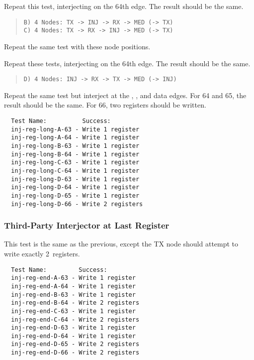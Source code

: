 Repeat this test, interjecting on the 64th edge. The result should be the
same.

\begin{quote}
  \texttt{B) 4 Nodes: TX -> INJ -> RX -> MED (-> TX)}\\
  \texttt{C) 4 Nodes: TX -> RX -> INJ -> MED (-> TX)}
\end{quote}

Repeat the same test with these node positions.

Repeat these tests, interjecting on the 64th edge. The result should be the
same.

\begin{quote}
  \texttt{D) 4 Nodes: INJ -> RX -> TX -> MED (-> INJ)}
\end{quote}

Repeat the same test but interject at the , , and 
data edges. For 64 and 65, the result should be the same. For 66, two
registers should be written.

\begin{verbatim}
  Test Name:          Success:
  inj-reg-long-A-63 - Write 1 register
  inj-reg-long-A-64 - Write 1 register
  inj-reg-long-B-63 - Write 1 register
  inj-reg-long-B-64 - Write 1 register
  inj-reg-long-C-63 - Write 1 register
  inj-reg-long-C-64 - Write 1 register
  inj-reg-long-D-63 - Write 1 register
  inj-reg-long-D-64 - Write 1 register
  inj-reg-long-D-65 - Write 1 register
  inj-reg-long-D-66 - Write 2 registers
\end{verbatim}

\subsubsection{Third-Party Interjector at Last Register}
\label{test:inj-reg-end}

This test is the same as the previous, except the TX node should attempt to
write exactly 2~registers.

\begin{verbatim}
  Test Name:         Success:
  inj-reg-end-A-63 - Write 1 register
  inj-reg-end-A-64 - Write 1 register
  inj-reg-end-B-63 - Write 1 register
  inj-reg-end-B-64 - Write 2 registers
  inj-reg-end-C-63 - Write 1 register
  inj-reg-end-C-64 - Write 2 registers
  inj-reg-end-D-63 - Write 1 register
  inj-reg-end-D-64 - Write 1 register
  inj-reg-end-D-65 - Write 2 registers
  inj-reg-end-D-66 - Write 2 registers
\end{verbatim}

